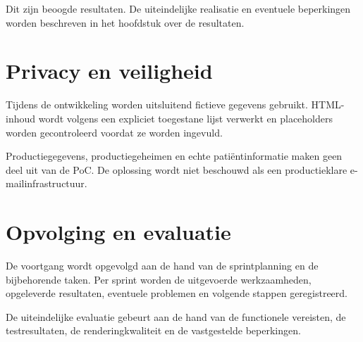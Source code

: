 Dit zijn beoogde resultaten. De uiteindelijke realisatie en eventuele
beperkingen worden beschreven in het hoofdstuk over de resultaten.

\section{Privacy en veiligheid}
Tijdens de ontwikkeling worden uitsluitend fictieve gegevens gebruikt.
HTML-inhoud wordt volgens een expliciet toegestane lijst verwerkt en
placeholders worden gecontroleerd voordat ze worden ingevuld.

Productiegegevens, productiegeheimen en echte patiëntinformatie maken geen
deel uit van de PoC. De oplossing wordt niet beschouwd als een productieklare
e-mailinfrastructuur.

\section{Opvolging en evaluatie}
De voortgang wordt opgevolgd aan de hand van de sprintplanning en de
bijbehorende taken. Per sprint worden de uitgevoerde werkzaamheden,
opgeleverde resultaten, eventuele problemen en volgende stappen geregistreerd.

De uiteindelijke evaluatie gebeurt aan de hand van de functionele vereisten,
de testresultaten, de renderingkwaliteit en de vastgestelde beperkingen.